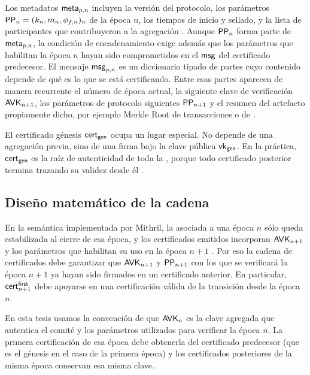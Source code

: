 Los metadatos $\mathsf{meta}_{p,n}$ incluyen la versión del protocolo, los parámetros $\mathsf{PP}_n = (k_n,m_n,\phi_{f,n})_n$ de la época $n$, los tiempos de inicio y sellado, y la lista de participantes que contribuyeron a la agregación \cite{MithrilDocsCertChain}. Aunque $\mathsf{PP}_n$ forma parte de $\mathsf{meta}_{p,n}$, la condición de encadenamiento exige además que los parámetros que habilitan la época $n$ hayan sido comprometidos en el $\mathsf{msg}$ del certificado predecesor. El mensaje $\mathsf{msg}_{p,n}$ es un diccionario tipado de partes cuyo contenido depende de qué es lo que se está certificando. Entre esas partes aparecen de manera recurrente el número de época actual, la siguiente clave de verificación $\mathsf{AVK}_{n+1}$, los parámetros de protocolo siguientes $\mathsf{PP}_{n+1}$ y el resumen del artefacto propiamente dicho, por ejemplo Merkle Root de transacciones o de \StakeDistribution.

El certificado génesis $\mathsf{cert}_{\mathsf{gen}}$ ocupa un lugar especial. No depende de una agregación previa, sino de una firma bajo la clave pública $\mathsf{vk}_{\mathsf{gen}}$. En la práctica, $\mathsf{cert}_{\mathsf{gen}}$ es la raíz de autenticidad de toda la \CertificateChain, porque todo certificado posterior termina trazando su validez desde él \cite{MithrilDocsCertChain}.

\subsection{Diseño matemático de la cadena}
\label{subsec:cadena-de-certificados-diseno-matematico-de-la-cadena}

En la semántica implementada por Mithril, la \StakeDistribution asociada a una época $n$ sólo queda estabilizada al cierre de esa época, y los certificados emitidos incorporan $\mathsf{AVK}_{n+1}$ y los parámetros que habilitan su uso en la época $n + 1$ \cite{MithrilDocsCertChain}. Por eso la cadena de certificados debe garantizar que $\mathsf{AVK}_{n+1}$ y $\mathsf{PP}_{n+1}$ con los que se verificará la época $n+1$ ya hayan sido firmados en un certificado anterior. En particular, $\mathsf{cert}^{\mathsf{first}}_{n+1}$ debe apoyarse en una certificación válida de la transición desde la época $n$.

En esta tesis usamos la convención de que $\mathsf{AVK}_n$ es la clave agregada que autentica el comité y los parámetros utilizados para verificar la época $n$. La primera certificación de esa época debe obtenerla del certificado predecesor (que es el génesis en el caso de la primera época) y los certificados posteriores de la misma época conservan esa misma clave.

